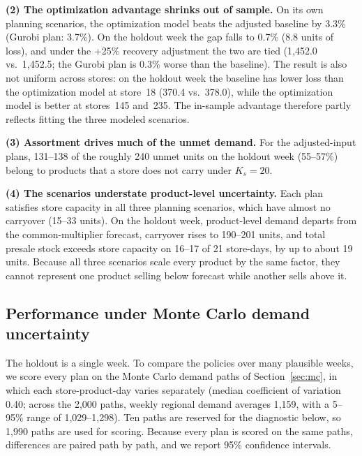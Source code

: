 \textbf{(2) The optimization advantage shrinks out of sample.} On its own planning
scenarios, the optimization model beats the adjusted baseline by 3.3\% (Gurobi
plan: 3.7\%). On the holdout week the gap falls to 0.7\% (8.8 units of loss), and
under the +25\% recovery adjustment the two are tied (1{,}452.0 vs.\ 1{,}452.5;
the Gurobi plan is 0.3\% worse than the baseline). The result is also not uniform
across stores: on the holdout week the baseline has lower loss than the
optimization model at store~18 (370.4 vs.\ 378.0), while the optimization model is
better at stores~145 and~235. The in-sample advantage therefore partly reflects
fitting the three modeled scenarios.

\textbf{(3) Assortment drives much of the unmet demand.} For the adjusted-input
plans, 131--138 of the roughly 240 unmet units on the holdout week (55--57\%)
belong to products that a store does not carry under $K_s=20$.

\textbf{(4) The scenarios understate product-level uncertainty.} Each plan
satisfies store capacity in all three planning scenarios, which have almost no
carryover (15--33 units). On the holdout week, product-level demand departs from
the common-multiplier forecast, carryover rises to 190--201 units, and total
presale stock exceeds store capacity on 16--17 of 21 store-days, by up to about
19 units. Because all three scenarios scale every product by the same factor, they
cannot represent one product selling below forecast while another sells above it.

\subsection*{Performance under Monte Carlo demand uncertainty}

The holdout is a single week. To compare the policies over many plausible weeks,
we score every plan on the Monte Carlo demand paths of Section~\ref{sec:mc}, in which each
store-product-day varies separately (median coefficient of variation 0.40; across the 2{,}000 paths, weekly
regional demand averages 1{,}159, with a 5--95\% range of 1{,}029--1{,}298). Ten
paths are reserved for the diagnostic below, so 1{,}990 paths are used for scoring.
Because every plan is scored on the same paths, differences are paired path by
path, and we report 95\% confidence intervals.

